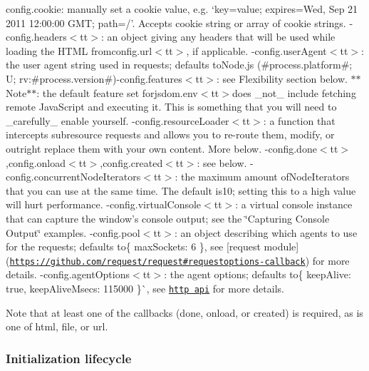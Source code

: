 \begin{DoxyItemize}
\item {\ttfamily config.\+cookie}\+: manually set a cookie value, e.\+g. `\textquotesingle{}key=value; expires=Wed, Sep 21 2011 12\+:00\+:00 G\+MT; path=/'{\ttfamily . Accepts cookie string or array of cookie strings. -\/}config.\+headers$<$tt$>$\+: an object giving any headers that will be used while loading the H\+T\+ML fromconfig.\+url$<$tt$>$, if applicable. -\/config.\+user\+Agent$<$tt$>$\+: the user agent string used in requests; defaults toNode.\+js (\#process.\+platform\#; U; rv\+:\#process.\+version\#){\ttfamily  -\/}config.\+features$<$tt$>$\+: see Flexibility section below. $\ast$$\ast$\+Note$\ast$$\ast$\+: the default feature set forjsdom.\+env$<$tt$>$does \+\_\+not\+\_\+ include fetching remote Java\+Script and executing it. This is something that you will need to \+\_\+carefully\+\_\+ enable yourself. -\/config.\+resource\+Loader$<$tt$>$\+: a function that intercepts subresource requests and allows you to re-\/route them, modify, or outright replace them with your own content. More below. -\/config.\+done$<$tt$>$,config.\+onload$<$tt$>$,config.\+created$<$tt$>$\+: see below. -\/config.\+concurrent\+Node\+Iterators$<$tt$>$\+: the maximum amount ofNode\+Iterator{\ttfamily s that you can use at the same time. The default is}10{\ttfamily ; setting this to a high value will hurt performance. -\/}config.\+virtual\+Console$<$tt$>$\+: a virtual console instance that can capture the window’s console output; see the \char`\"{}\+Capturing Console Output\char`\"{} examples. -\/config.\+pool$<$tt$>$\+: an object describing which agents to use for the requests; defaults to\{ max\+Sockets\+: 6 \}{\ttfamily , see \mbox{[}request module\mbox{]}(\href{https://github.com/request/request#requestoptions-callback}{\tt https\+://github.\+com/request/request\#requestoptions-\/callback}) for more details. -\/}config.\+agent\+Options$<$tt$>$\+: the agent options; defaults to\{ keep\+Alive\+: true, keep\+Alive\+Msecs\+: 115000 \}\`{}, see \href{https://nodejs.org/api/http.html}{\tt http api} for more details.
\end{DoxyItemize}

Note that at least one of the callbacks ({\ttfamily done}, {\ttfamily onload}, or {\ttfamily created}) is required, as is one of {\ttfamily html}, {\ttfamily file}, or {\ttfamily url}.

\subsubsection*{Initialization lifecycle}

